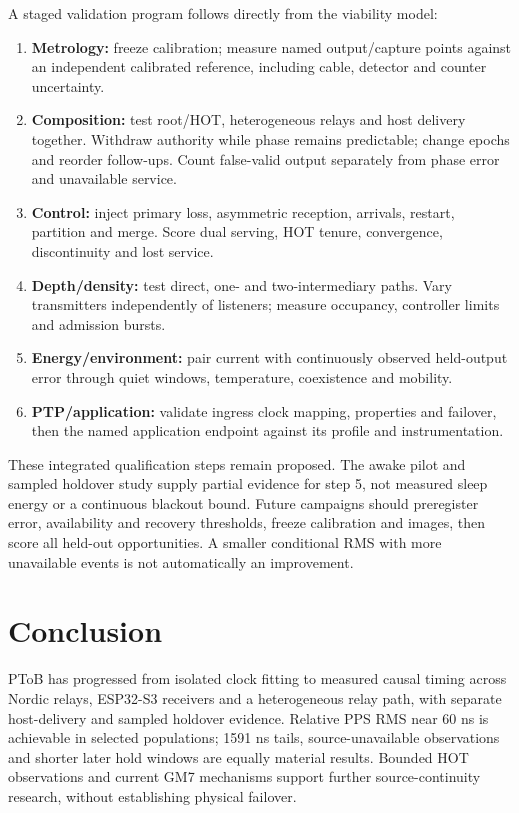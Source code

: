 \documentclass[11pt,letterpaper]{article}
\begin{document}
A staged validation program follows directly from the viability model:
\begin{enumerate}
\item \textbf{Metrology:} freeze calibration; measure named output/capture points against an independent calibrated reference, including cable, detector and counter uncertainty.
\item \textbf{Composition:} test root/HOT, heterogeneous relays and host delivery together. Withdraw authority while phase remains predictable; change epochs and reorder follow-ups. Count false-valid output separately from phase error and unavailable service.
\item \textbf{Control:} inject primary loss, asymmetric reception, arrivals, restart, partition and merge. Score dual serving, HOT tenure, convergence, discontinuity and lost service.
\item \textbf{Depth/density:} test direct, one- and two-intermediary paths. Vary transmitters independently of listeners; measure occupancy, controller limits and admission bursts.
\item \textbf{Energy/environment:} pair current with continuously observed held-output error through quiet windows, temperature, coexistence and mobility.
\item \textbf{PTP/application:} validate ingress clock mapping, properties and failover, then the named application endpoint against its profile and instrumentation.
\end{enumerate}
These integrated qualification steps remain proposed. The awake pilot and sampled holdover study supply partial evidence for step 5, not measured sleep energy or a continuous blackout bound. Future campaigns should preregister error, availability and recovery thresholds, freeze calibration and images, then score all held-out opportunities. A smaller conditional RMS with more unavailable events is not automatically an improvement.

\section{Conclusion}
PToB has progressed from isolated clock fitting to measured causal timing across Nordic relays, ESP32-S3 receivers and a heterogeneous relay path, with separate host-delivery and sampled holdover evidence. Relative PPS RMS near 60 ns is achievable in selected populations; 1591 ns tails, source-unavailable observations and shorter later hold windows are equally material results. Bounded HOT observations and current GM7 mechanisms support further source-continuity research, without establishing physical failover.
\end{document}
